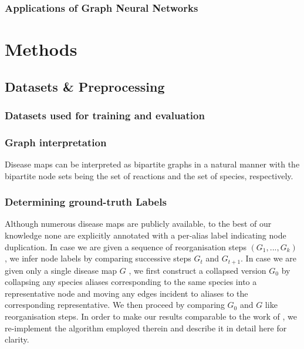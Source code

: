 \documentclass[
	fontsize=10pt, %
	twoside=false, %
	secnumdepth=1, %
]{kaobook}
\begin{document}
\subsection{Applications of Graph Neural Networks}
\label{sec:gnn-applications}




\chapter{Methods}
\label{sec:methods}
\blindtext


\section{Datasets \& Preprocessing}
\label{sec:datasets}
\blindtext

\subsection{Datasets used for training and evaluation}




\subsection{Graph interpretation}
Disease maps can be interpreted as bipartite graphs in a natural manner with the
bipartite node sets being the set of reactions and the set of species, respectively.

\subsection{Determining ground-truth Labels}
Although numerous disease maps are publicly available, to the best of our
knowledge none are explicitly annotated with a per-alias label indicating node
duplication. In case we are given a sequence of reorganisation steps $(G_1, ..., G_k)$ %
, we infer node labels by comparing successive steps $G_t$ and $G_{t+1}$. In
case we are given only a single disease map $G$
, we first construct a collapsed version $G_0$ by collapsing any species aliases
corresponding to the same species into a representative node and moving any edges
incident to aliases to the corresponding representative. We then proceed by
comparing $G_0$ and $G$ like reorganisation steps.
%
In order to make our results comparable to the work of
\citeauthor{nielsen_MachineLearningSupport_2019}, we re-implement the algorithm
employed therein and describe it in detail here for clarity.
%
\end{document}
